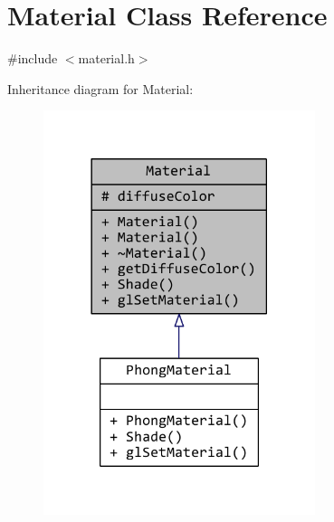 \hypertarget{classMaterial}{\section{Material Class Reference}
\label{classMaterial}
}


{\ttfamily \#include $<$material.\+h$>$}



Inheritance diagram for Material\+:
\nopagebreak
\begin{figure}[H]
\begin{center}
\leavevmode
\includegraphics[width=225pt]{classMaterial__inherit__graph}
\end{center}
\end{figure}


